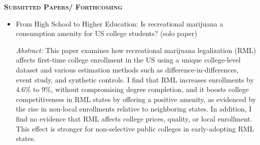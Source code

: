\documentclass[10pt,letterpaper]{article}
\begin{document}
\textsc{\textbf{Submitted Papers/ Forthcoming}}
\begin{itemize}
\item From High School to Higher Education: Is recreational marijuana a consumption amenity  for US college students? (solo paper)

\textit{Abstract: } This paper examines how recreational marijuana legalization (RML) affects first-time college enrollment in the US using a unique college-level dataset and various estimation methods such as difference-in-differences, event study, and synthetic controls. I find that RML increases enrollments by 4.6\% to 9\%, without compromising degree completion, and it boosts college competitiveness in RML states by offering a positive amenity, as evidenced by the rise in non-local enrollments relative to neighboring states. In addition, I find no evidence that RML affects college prices, quality, or local enrollment. This effect is stronger for non-selective public colleges in early-adopting RML states.
\end{itemize}
\end{document}
